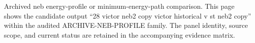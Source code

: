 Archived neb energy-profile or minimum-energy-path comparison. This page shows the candidate output ``28 victor neb2 copy victor historical v st neb2 copy'' within the audited ARCHIVE-NEB-PROFILE family. The panel identity, source scope, and current status are retained in the accompanying evidence matrix.
